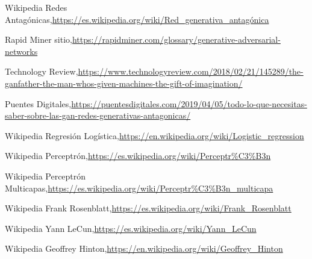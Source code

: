 \documentclass[a4paper]{article}
\begin{document}
\begin{thebibliography}{9}


Wikipedia Redes Antagónicas,\url{https://es.wikipedia.org/wiki/Red_generativa_antagónica}

Rapid Miner sitio,\url{https://rapidminer.com/glossary/generative-adversarial-networks}

\bibitem[TECHREVIEW][techreview]
 Technology Review,\url{https://www.technologyreview.com/2018/02/21/145289/the-ganfather-the-man-whos-given-machines-the-gift-of-imagination/}

Puentes Digitales,\url{https://puentesdigitales.com/2019/04/05/todo-lo-que-necesitas-saber-sobre-las-gan-redes-generativas-antagonicas/}


Wikipedia Regresión Logística,\url{https://en.wikipedia.org/wiki/Logistic_regression}

Wikipedia Perceptrón,\url{https://es.wikipedia.org/wiki/Perceptr\%C3\%B3n}

Wikipedia Perceptrón Multicapas,\url{https://es.wikipedia.org/wiki/Perceptr\%C3\%B3n_multicapa}

Wikipedia Frank Rosenblatt,\url{https://es.wikipedia.org/wiki/Frank_Rosenblatt}

Wikipedia Yann LeCun,\url{https://es.wikipedia.org/wiki/Yann_LeCun}

Wikipedia Geoffrey Hinton,\url{https://en.wikipedia.org/wiki/Geoffrey_Hinton}

\end{thebibliography}
\end{document}
